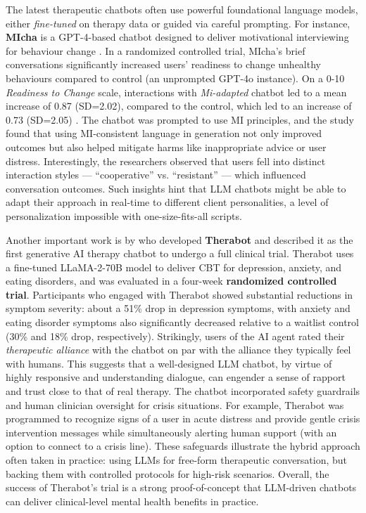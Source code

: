 The latest therapeutic chatbots often use powerful foundational language models, either \emph{fine-tuned} on therapy data or guided via careful prompting. For instance, \textbf{MIcha} is a GPT-4-based chatbot designed to deliver motivational interviewing for behaviour change \cite{Meyer2025}. In a randomized controlled trial, MIcha's brief conversations significantly increased users' readiness to change unhealthy behaviours compared to control (an unprompted GPT-4o instance). On a 0-10 \emph{Readiness to Change} \cite{BienerAbrams1991} scale, interactions with \emph{Mi-adapted} chatbot led to a mean increase of 0.87 (SD=2.02), compared to the control, which led to an increase of 0.73 (SD=2.05) \cite{Meyer2025}.
The chatbot was prompted to use MI principles, and the study found that using MI-consistent language in generation not only improved outcomes but also helped mitigate harms like inappropriate advice or user distress. Interestingly, the researchers observed that users fell into distinct interaction styles --- ``cooperative'' vs. ``resistant'' --- which influenced conversation outcomes. Such insights hint that LLM chatbots might be able to adapt their approach in real-time to different client personalities, a level of personalization impossible with one-size-fits-all scripts.

Another important work is by  \citet{doi:10.1056/AIoa2400802} who developed \textbf{Therabot} and described it as the first generative AI therapy chatbot to undergo a full clinical trial. Therabot uses a fine-tuned LLaMA-2-70B model to deliver CBT for depression, anxiety, and eating disorders, and was evaluated in a four-week \textbf{randomized controlled trial}. Participants who engaged with Therabot showed substantial reductions in symptom severity: about a 51\% drop in depression symptoms, with anxiety and eating disorder symptoms also significantly decreased relative to a waitlist control (30\% and 18\% drop, respectively). Strikingly, users of the AI agent rated their \emph{therapeutic alliance} with the chatbot on par with the alliance they typically feel with humans. This suggests that a well-designed LLM chatbot, by virtue of highly responsive and understanding dialogue, can engender a sense of rapport and trust close to that of real therapy. The chatbot incorporated safety guardrails and human clinician oversight for crisis situations. For example, Therabot was programmed to recognize signs of a user in acute distress and provide gentle crisis intervention messages while simultaneously alerting human support (with an option to connect to a crisis line). These safeguards illustrate the hybrid approach often taken in practice: using LLMs for free-form therapeutic conversation, but backing them with controlled protocols for high-risk scenarios. Overall, the success of Therabot’s trial is a strong proof-of-concept that LLM-driven chatbots can deliver clinical-level mental health benefits in practice.


